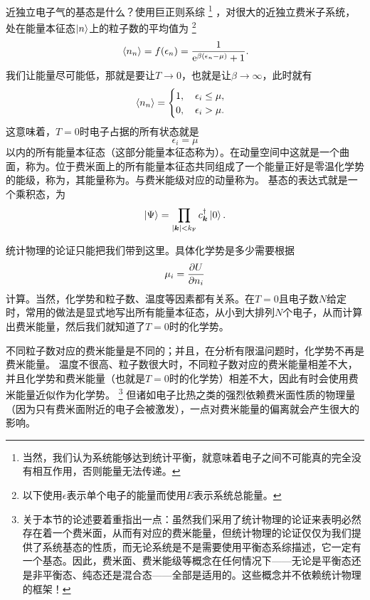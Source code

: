 近独立电子气的基态是什么？使用巨正则系综%
\footnote{当然，我们认为系统能够达到统计平衡，就意味着电子之间不可能真的完全没有相互作用，否则能量无法传递。}%
，对很大的近独立费米子系统，处在能量本征态$\ket{n}$上的粒子数的平均值为%
\footnote{以下使用$\epsilon$表示单个电子的能量而使用$E$表示系统总能量。}%
\begin{equation}
    \expval*{{n}_n} = f(\epsilon_n) = \frac{1}{\mathrm{e}^{\beta (\epsilon_n-\mu)} + 1}.
    \label{eq:fermi-dirac-distribution}
\end{equation}
我们让能量尽可能低，那就是要让$T\to 0$，也就是让$\beta\to \infty$，此时就有
\begin{equation}
    \expval*{{n}_n} = \begin{cases}
        1, \quad \epsilon_i \leq \mu, \\
        0, \quad \epsilon_i > \mu.
    \end{cases}
\end{equation}
这意味着，$T=0$时电子占据的所有状态就是
\begin{equation}
    \epsilon_i = \mu
\end{equation}
以内的所有能量本征态（这部分能量本征态称为）。在动量空间中这就是一个曲面，称为。位于费米面上的所有能量本征态共同组成了一个能量正好是零温化学势的能级，称为，其能量称为。与费米能级对应的动量称为。
基态的表达式就是一个乘积态，为
\begin{equation}
    \ket{\Psi} = \prod_{\abs{\vb*{k}} < k_\text{F}} {c}^\dagger_{\vb*{k}} \ket{0}.
    \label{eq:ground-state}
\end{equation}

统计物理的论证只能把我们带到这里。具体化学势是多少需要根据
\begin{equation}
    \mu_i = \pdv{U}{n_i}
\end{equation}
计算。当然，化学势和粒子数、温度等因素都有关系。在$T=0$且电子数$N$给定时，常用的做法是显式地写出所有能量本征态，从小到大排列$N$个电子，从而计算出费米能量，然后我们就知道了$T=0$时的化学势。

不同粒子数对应的费米能量是不同的；并且，在分析有限温问题时，化学势不再是费米能量。
温度不很高、粒子数很大时，不同粒子数对应的费米能量相差不大，并且化学势和费米能量（也就是$T=0$时的化学势）相差不大，因此有时会使用费米能量近似作为化学势。%
\footnote{关于本节的论述要着重指出一点：虽然我们采用了统计物理的论证来表明必然存在着一个费米面，从而有对应的费米能量，但统计物理的论证仅仅为我们提供了系统基态的性质，而无论系统是不是需要使用平衡态系综描述，它一定有一个基态。因此，费米面、费米能级等概念在任何情况下——无论是平衡态还是非平衡态、纯态还是混合态——全部是适用的。这些概念并不依赖统计物理的框架！}%
但诸如电子比热之类的强烈依赖费米面性质的物理量（因为只有费米面附近的电子会被激发），一点对费米能量的偏离就会产生很大的影响。

